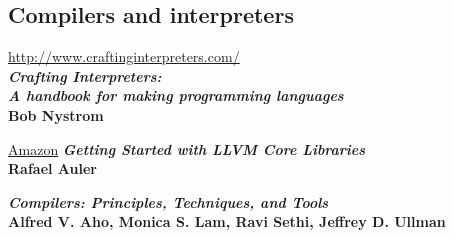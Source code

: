 \begin{thebibliography}{99}
\section*{Compilers and interpreters}

\url{http://www.craftinginterpreters.com/}\\
\emph{\textbf{Crafting Interpreters:\\A handbook for making programming
languages}}\\
\textbf{Bob Nystrom}

\href{https://www.amazon.com/Getting-Started-LLVM-Core-Libraries/dp/1782166920}{Amazon}
\emph{\textbf{Getting Started with LLVM Core Libraries}}\\
\textbf{Rafael Auler}

\emph{\textbf{Compilers: Principles, Techniques, and Tools}}\\
\textbf{Alfred V. Aho, Monica S. Lam, Ravi Sethi, Jeffrey D. Ullman }

\end{thebibliography}
